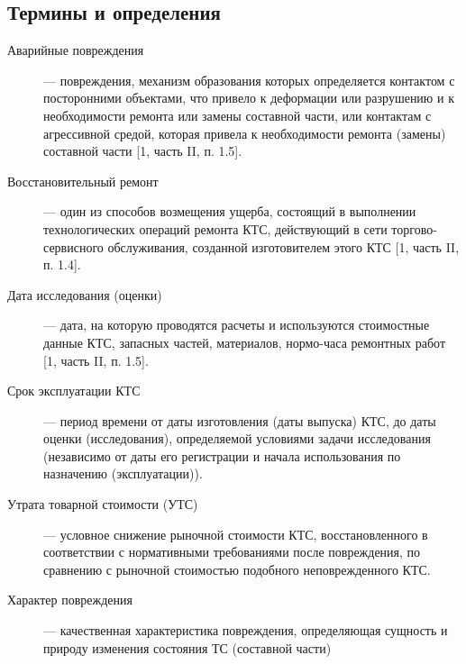 \subsection{Термины и определения}
\begin{description}
	\item[Аварийные повреждения] --- повреждения, механизм образования которых определяется контактом с посторонними объектами, что привело к деформации или разрушению и к необходимости ремонта или замены составной части, или контактам с агрессивной средой, которая привела к необходимости ремонта (замены) составной части [1, часть II, п. 1.5].
	\item[Восстановительный ремонт]--- один из способов возмещения ущерба, состоящий в выполнении технологических операций ремонта КТС, действующий в сети торгово-сервисного обслуживания, созданной изготовителем этого КТС [1, часть II, п. 1.4].
	\item[Дата исследования (оценки)]--- дата, на которую проводятся расчеты и используются стоимостные данные КТС, запасных частей, материалов, нормо-часа ремонтных работ [1, часть II, п. 1.5].
	\item[Срок эксплуатации КТС]--- период времени от даты изготовления (даты выпуска) КТС, до даты оценки (исследования), определяемой условиями задачи исследования (независимо от даты его регистрации и начала использования по назначению (эксплуатации)).
	\item[Утрата товарной стоимости (УТС)]--- условное снижение рыночной стоимости КТС, восстановленного в соответствии с нормативными требованиями после повреждения, по сравнению с рыночной стоимостью подобного неповрежденного КТС. 
	\item[Характер повреждения]--- качественная характеристика повреждения, определяющая сущность и природу изменения состояния ТС (составной части)

\end{description}

